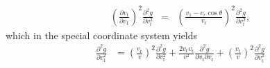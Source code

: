 \documentclass[11pt]{article}
\newcommand{\rt}{\mathrm{t}}
\newcommand{\rr}{\mathrm{r}}
\newcommand{\vr}{v_{\rr}}
\newcommand{\vt}{v_{\rt}}
\begin{document}
\begin{appendices}
\begin{equation}
\begin{array}{ccl}
  \displaystyle{\left(\frac{\partial v_{t}}{\partial v_{1}}\right)^{2}\frac{\partial^{2}g}{\partial v_{t}^{2}}}&=& \displaystyle{\left(\frac{v_{1}-v_{r}\cos\theta}{v_{t}}\right)^{2}\frac{\partial^{2}g}{\partial v_{t}^{2}}} ,
\end{array}
\label{eq:d2gdv12_Arbitrary}
\end{equation}
which in the special coordinate system yields
\begin{align}
\frac{\partial^{2}g}{\partial v_{1}^{2}} & =\left(\frac{\vr}{v}\right)^{2}\frac{\partial^{2}g}{\partial \vr^{2}}+\frac{2\vr\vt}{v^{2}}\frac{\partial^{2}g}{\partial \vt\partial \vr}+\left(\frac{\vt}{v}\right)^{2}\frac{\partial^{2}g}{\partial \vt^{2}}
\end{align}


\end{appendices}
\end{document}
